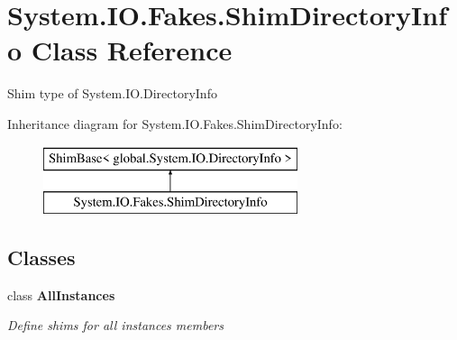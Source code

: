 \hypertarget{class_system_1_1_i_o_1_1_fakes_1_1_shim_directory_info}{\section{System.\-I\-O.\-Fakes.\-Shim\-Directory\-Info Class Reference}
\label{class_system_1_1_i_o_1_1_fakes_1_1_shim_directory_info}
}


Shim type of System.\-I\-O.\-Directory\-Info 


Inheritance diagram for System.\-I\-O.\-Fakes.\-Shim\-Directory\-Info\-:\begin{figure}[H]
\begin{center}
\leavevmode
\includegraphics[height=2.000000cm]{class_system_1_1_i_o_1_1_fakes_1_1_shim_directory_info}
\end{center}
\end{figure}
\subsection*{Classes}
\begin{DoxyCompactItemize}
\item 
class {\bfseries All\-Instances}
\begin{DoxyCompactList}\small\item\em Define shims for all instances members\end{DoxyCompactList}\end{DoxyCompactItemize}
